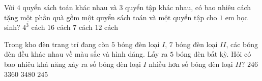 \begin{ex}%
	Với $4$ quyển sách toán khác nhau và $3$ quyển tập khác nhau, có bao nhiêu cách tặng một phần quà gồm một quyển sách toán và một  quyển tập cho $1$ em học sinh?
	\choice 
		{$4^3$ cách} 
		{$16$ cách} 
		{$7$  cách}
		 {\True $12$ cách}
\end{ex}

\begin{ex}%
	Trong kho đèn trang trí đang còn  $5$ bóng đèn loại $I$, $7$ bóng đèn loại $II$, các bóng đèn đều khác nhau về màu sắc và hình dáng. Lấy ra $5$ bóng đèn bất kỳ. Hỏi có bao nhiêu khả năng xảy ra số bóng đèn loại $I$ nhiều hơn số bóng đèn loại $II$?
	\choice 
		{\True  $246$}
		 {$3360$}
		 {$3480$}
		 {$245$}
\end{ex}

